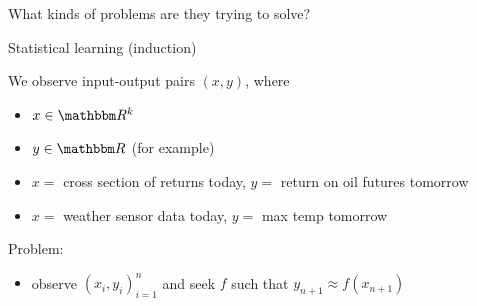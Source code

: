 \begin{frame}
    
    What kinds of problems are they trying to solve?

\end{frame}




\begin{frame}{Statistical learning (induction)}
    
    We observe input-output pairs $(x, y)$, where
    \begin{itemize}
        \item $x \in \RR^k$
        \item $y \in \RR$  (for example)
    \end{itemize}

    \Egs
    \begin{itemize}
        \item $x = $ cross section of returns today, $y = $ return on oil futures tomorrow
        \vspace{0.5em}
        \item $x = $ weather sensor data today, $y = $ max temp tomorrow
    \end{itemize}
        \vspace{0.5em}
        \vspace{0.5em}

    Problem:

    \begin{itemize}
        \item observe $(x_i, y_i)_{i=1}^n$ and seek $f$ such that $y_{n+1}
            \approx f(x_{n+1})$
    \end{itemize}

\end{frame}


